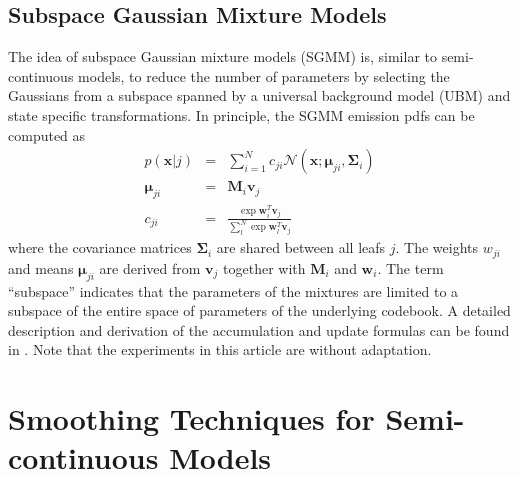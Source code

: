 \documentclass{article}
\def \x{{\mathbf x}}
\def \v{{\mathbf v}}
\def \w{{\mathbf w}}
\def \M{{\mathbf M}}
\def \m{{\bm \mu}}
\def \k{{\mathbf \Sigma}}
\def \nv{{\mathcal N}}
\begin{document}
\subsection{Subspace Gaussian Mixture Models}
The idea of subspace Gaussian mixture models (SGMM) is, similar to 
semi-continuous models, to reduce the number of parameters by selecting the
Gaussians from a subspace spanned by a universal background model (UBM)
and state specific transformations. In principle, the SGMM emission pdfs can
be computed as
\begin{eqnarray}
p(\x | j) & = & \sum_{i=1}^{N} c_{ji} \nv(\x; \m_{ji}, \k_i) \\
\m_{ji}    & = & \M_i \v_j \\
c_{ji}     & = & \frac{\exp \w_i^T \v_j}{\sum_l^N \exp \w_l^T \v_j}
\end{eqnarray}
where the covariance matrices $\k_i$ are shared between all leafs $j$. The
weights $w_{ji}$ and means $\m_{ji}$ are derived from $\v_j$ together with
$\M_i$ and $\w_i$. The term ``subspace'' indicates that the parameters of the
mixtures are limited to a subspace of the entire space of parameters of
the underlying codebook.
%
A detailed description and derivation of the accumulation and update formulas
can be found in \cite{povey2011sgm}. Note that the experiments in this article
are without adaptation.

\section{Smoothing Techniques for Semi-continuous Models}
\label{sec:smooth}
%
\end{document}
